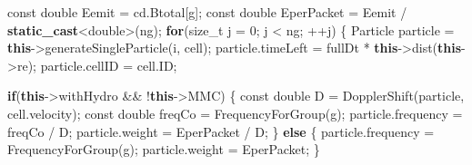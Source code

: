 \documentclass[
]{article}
\newenvironment{Shaded}{}{}
\newcommand{\AttributeTok}[1]{\textcolor[rgb]{0.49,0.56,0.16}{#1}}
\newcommand{\ControlFlowTok}[1]{\textcolor[rgb]{0.00,0.44,0.13}{\textbf{#1}}}
\newcommand{\DataTypeTok}[1]{\textcolor[rgb]{0.56,0.13,0.00}{#1}}
\newcommand{\DecValTok}[1]{\textcolor[rgb]{0.25,0.63,0.44}{#1}}
\newcommand{\KeywordTok}[1]{\textcolor[rgb]{0.00,0.44,0.13}{\textbf{#1}}}
\newcommand{\NormalTok}[1]{#1}
\newcommand{\OperatorTok}[1]{\textcolor[rgb]{0.40,0.40,0.40}{#1}}
\begin{document}
\begin{Shaded}
\begin{Highlighting}[]
\AttributeTok{const} \DataTypeTok{double}\NormalTok{ Eemit }\OperatorTok{=}\NormalTok{ cd}\OperatorTok{.}\NormalTok{Btotal}\OperatorTok{[}\NormalTok{g}\OperatorTok{];}
\AttributeTok{const} \DataTypeTok{double}\NormalTok{ EperPacket }\OperatorTok{=}\NormalTok{ Eemit }\OperatorTok{/} \KeywordTok{static\_cast}\OperatorTok{\textless{}}\DataTypeTok{double}\OperatorTok{\textgreater{}(}\NormalTok{ng}\OperatorTok{);}
\ControlFlowTok{for}\OperatorTok{(}\DataTypeTok{size\_t}\NormalTok{ j }\OperatorTok{=} \DecValTok{0}\OperatorTok{;}\NormalTok{ j }\OperatorTok{\textless{}}\NormalTok{ ng}\OperatorTok{;} \OperatorTok{++}\NormalTok{j}\OperatorTok{)}
\OperatorTok{\{}
\NormalTok{    Particle particle }\OperatorTok{=} \KeywordTok{this}\OperatorTok{{-}\textgreater{}}\NormalTok{generateSingleParticle}\OperatorTok{(}\NormalTok{i}\OperatorTok{,}\NormalTok{ cell}\OperatorTok{);}
\NormalTok{    particle}\OperatorTok{.}\NormalTok{timeLeft }\OperatorTok{=}\NormalTok{ fullDt }\OperatorTok{*} \KeywordTok{this}\OperatorTok{{-}\textgreater{}}\NormalTok{dist}\OperatorTok{(}\KeywordTok{this}\OperatorTok{{-}\textgreater{}}\NormalTok{re}\OperatorTok{);}
\NormalTok{    particle}\OperatorTok{.}\NormalTok{cellID }\OperatorTok{=}\NormalTok{ cell}\OperatorTok{.}\NormalTok{ID}\OperatorTok{;}

    \ControlFlowTok{if}\OperatorTok{(}\KeywordTok{this}\OperatorTok{{-}\textgreater{}}\NormalTok{withHydro }\OperatorTok{\&\&} \OperatorTok{!}\KeywordTok{this}\OperatorTok{{-}\textgreater{}}\NormalTok{MMC}\OperatorTok{)}
    \OperatorTok{\{}
        \AttributeTok{const} \DataTypeTok{double}\NormalTok{ D }\OperatorTok{=}\NormalTok{ DopplerShift}\OperatorTok{(}\NormalTok{particle}\OperatorTok{,}\NormalTok{ cell}\OperatorTok{.}\NormalTok{velocity}\OperatorTok{);}
        \AttributeTok{const} \DataTypeTok{double}\NormalTok{ freqCo }\OperatorTok{=}\NormalTok{ FrequencyForGroup}\OperatorTok{(}\NormalTok{g}\OperatorTok{);}
\NormalTok{        particle}\OperatorTok{.}\NormalTok{frequency }\OperatorTok{=}\NormalTok{ freqCo }\OperatorTok{/}\NormalTok{ D}\OperatorTok{;}
\NormalTok{        particle}\OperatorTok{.}\NormalTok{weight }\OperatorTok{=}\NormalTok{ EperPacket }\OperatorTok{/}\NormalTok{ D}\OperatorTok{;}
    \OperatorTok{\}}
    \ControlFlowTok{else}
    \OperatorTok{\{}
\NormalTok{        particle}\OperatorTok{.}\NormalTok{frequency }\OperatorTok{=}\NormalTok{ FrequencyForGroup}\OperatorTok{(}\NormalTok{g}\OperatorTok{);}
\NormalTok{        particle}\OperatorTok{.}\NormalTok{weight }\OperatorTok{=}\NormalTok{ EperPacket}\OperatorTok{;}
    \OperatorTok{\}}


\end{Highlighting}
\end{Shaded}
\end{document}
